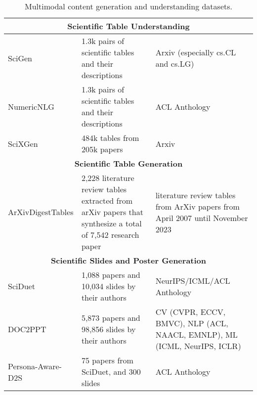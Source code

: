 \begin{table}[t]
\begin{small}
\begin{tabular}{p{3cm}|p{6cm}|p{5cm}}
\multicolumn{3}{c}{\textbf{Scientific Table Understanding}} \\ \hline
SciGen \cite{BENCHMARKS2021_149e9677} & 1.3k pairs of scientific tables and their descriptions & Arxiv (especially cs.CL and cs.LG) \\ 
 NumericNLG \cite{suadaa-etal-2021-towards} & 1.3k pairs of scientific tables and their descriptions & ACL Anthology \\
SciXGen \cite{chen-etal-2021-scixgen-scientific} & 484k tables from 205k papers & Arxiv  \\
\hline 
    \multicolumn{3}{c}{\textbf{Scientific Table Generation}} \\ \hline
ArXivDigestTables \cite{newman-etal-2024-arxivdigestables} & 2,228 literature review tables extracted from arXiv papers that synthesize a total of 7,542 research paper &  literature review tables from ArXiv papers from April 2007 until
November 2023 %
\\
\hline
  \multicolumn{3}{c}{\textbf{Scientific Slides and Poster Generation}} \\ \hline
SciDuet \cite{sun-etal-2021-d2s} & 1,088 papers and 10,034 slides by their authors & NeurIPS/ICML/ACL  Anthology  \\ 
DOC2PPT \cite{Fu2021DOC2PPTAP} & 5,873 papers and 98,856 slides by their authors  & CV (CVPR, ECCV,
BMVC), NLP (ACL, NAACL, EMNLP), ML (ICML, NeurIPS, ICLR) \\ 
Persona-Aware-D2S \cite{mondal-etal-2024-presentations} & 75 papers from SciDuet, and 300 slides %
& ACL Anthology \\

 
\bottomrule
    \end{tabular}
    \caption{Multimodal content generation and understanding datasets.}
    \label{tab:section4.4_data}
\end{small}
\end{table}






